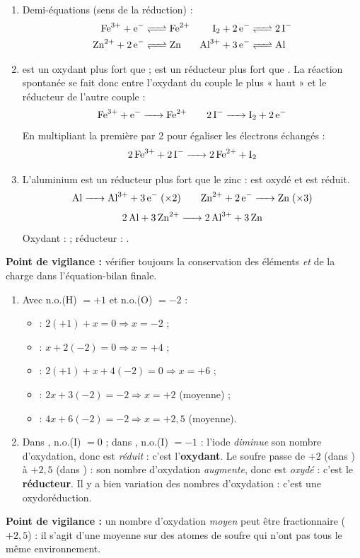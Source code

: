 \documentclass[11pt]{article}
\newcommand{\cle}[1]{{\popxbold\color{popdark}#1}}
\begin{document}
\begin{corrige}
\begin{enumerate}
\item Demi-équations (sens de la réduction) :
\begin{align*}
\ce{Fe^3+ + e- &<=> Fe^2+} & \ce{I2 + 2e- &<=> 2 I-}\\
\ce{Zn^2+ + 2e- &<=> Zn} & \ce{Al^3+ + 3e- &<=> Al}
\end{align*}
\item {} est un oxydant plus fort que  ;  est un réducteur plus fort que . La réaction spontanée se fait donc entre l'oxydant du couple le plus « haut » et le réducteur de l'autre couple :
\[ \ce{Fe^3+ + e- -> Fe^2+} \qquad \ce{2 I- -> I2 + 2e-} \]
En multipliant la première par 2 pour égaliser les électrons échangés :
\[ \ce{2 Fe^3+ + 2 I- -> 2 Fe^2+ + I2} \]
\item L'aluminium est un réducteur plus fort que le zinc :  est oxydé et  est réduit.
\[ \ce{Al -> Al^3+ + 3e-} \;(\times 2) \qquad \ce{Zn^2+ + 2e- -> Zn} \;(\times 3) \]
\[ \ce{2 Al + 3 Zn^2+ -> 2 Al^3+ + 3 Zn} \]
Oxydant :  ; réducteur : .
\end{enumerate}
\textbf{Point de vigilance :} vérifier toujours la conservation des éléments \emph{et} de la charge dans l'équation-bilan finale.
\end{corrige}

\begin{corrige}
\begin{enumerate}
\item Avec n.o.(H) $= +1$ et n.o.(O) $= -2$ :
\begin{itemize}
\item {} : $2(+1) + x = 0 \Rightarrow x = -2$ ;
\item {} : $x + 2(-2) = 0 \Rightarrow x = +4$ ;
\item {} : $2(+1) + x + 4(-2) = 0 \Rightarrow x = +6$ ;
\item {} : $2x + 3(-2) = -2 \Rightarrow x = +2$ (moyenne) ;
\item {} : $4x + 6(-2) = -2 \Rightarrow x = +2{,}5$ (moyenne).
\end{itemize}
\item Dans , n.o.(I) $= 0$ ; dans , n.o.(I) $= -1$ : l'iode \emph{diminue} son nombre d'oxydation, donc  est \emph{réduit} : c'est l'\textbf{oxydant}. Le soufre passe de $+2$ (dans ) à $+2{,}5$ (dans ) : son nombre d'oxydation \emph{augmente}, donc  est \emph{oxydé} : c'est le \textbf{réducteur}. Il y a bien variation des nombres d'oxydation : c'est une \cle{oxydoréduction}.
\end{enumerate}
\textbf{Point de vigilance :} un nombre d'oxydation \emph{moyen} peut être fractionnaire ($+2{,}5$) : il s'agit d'une moyenne sur des atomes de soufre qui n'ont pas tous le même environnement.
\end{corrige}
\end{document}
